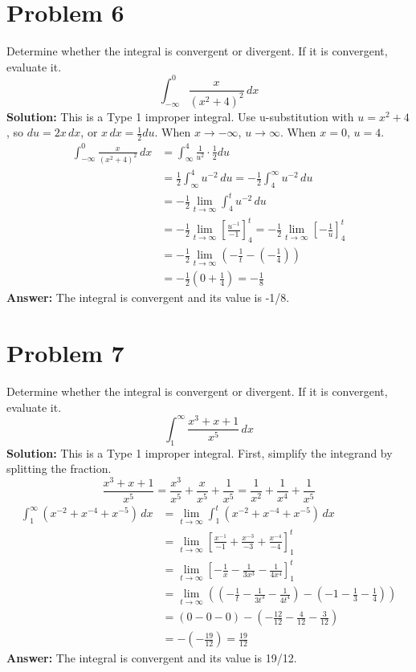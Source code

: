 \documentclass{article}
\begin{document}
\section{Problem 6}
Determine whether the integral is convergent or divergent. If it is convergent, evaluate it.
\[ \int_{-\infty}^{0} \frac{x}{(x^2+4)^2} \,dx \]
\textbf{Solution:}
This is a Type 1 improper integral. Use u-substitution with $u = x^2+4$, so $du = 2x\,dx$, or $x\,dx = \frac{1}{2}du$.
When $x \to -\infty$, $u \to \infty$. When $x=0$, $u=4$.
\begin{align*}
    \int_{-\infty}^{0} \frac{x}{(x^2+4)^2} \,dx &= \int_{\infty}^{4} \frac{1}{u^2} \cdot \frac{1}{2}du \\
    &= \frac{1}{2} \int_{\infty}^{4} u^{-2} \,du = -\frac{1}{2} \int_{4}^{\infty} u^{-2} \,du \\
    &= -\frac{1}{2} \lim_{t \to \infty} \int_{4}^{t} u^{-2} \,du \\
    &= -\frac{1}{2} \lim_{t \to \infty} \left[ \frac{u^{-1}}{-1} \right]_{4}^{t} = -\frac{1}{2} \lim_{t \to \infty} \left[ -\frac{1}{u} \right]_{4}^{t} \\
    &= -\frac{1}{2} \lim_{t \to \infty} \left( -\frac{1}{t} - \left(-\frac{1}{4}\right) \right) \\
    &= -\frac{1}{2} \left( 0 + \frac{1}{4} \right) = -\frac{1}{8}
\end{align*}
\textbf{Answer:} The integral is convergent and its value is -1/8.

\section{Problem 7}
Determine whether the integral is convergent or divergent. If it is convergent, evaluate it.
\[ \int_{1}^{\infty} \frac{x^3 + x + 1}{x^5} \,dx \]
\textbf{Solution:}
This is a Type 1 improper integral. First, simplify the integrand by splitting the fraction.
\[ \frac{x^3 + x + 1}{x^5} = \frac{x^3}{x^5} + \frac{x}{x^5} + \frac{1}{x^5} = \frac{1}{x^2} + \frac{1}{x^4} + \frac{1}{x^5} \]
\begin{align*}
    \int_{1}^{\infty} \left( x^{-2} + x^{-4} + x^{-5} \right) \,dx &= \lim_{t \to \infty} \int_{1}^{t} \left( x^{-2} + x^{-4} + x^{-5} \right) \,dx \\
    &= \lim_{t \to \infty} \left[ \frac{x^{-1}}{-1} + \frac{x^{-3}}{-3} + \frac{x^{-4}}{-4} \right]_{1}^{t} \\
    &= \lim_{t \to \infty} \left[ -\frac{1}{x} - \frac{1}{3x^3} - \frac{1}{4x^4} \right]_{1}^{t} \\
    &= \lim_{t \to \infty} \left( \left(-\frac{1}{t} - \frac{1}{3t^3} - \frac{1}{4t^4}\right) - \left(-1 - \frac{1}{3} - \frac{1}{4}\right) \right) \\
    &= (0 - 0 - 0) - \left(-\frac{12}{12} - \frac{4}{12} - \frac{3}{12}\right) \\
    &= - \left(-\frac{19}{12}\right) = \frac{19}{12}
\end{align*}
\textbf{Answer:} The integral is convergent and its value is 19/12.
\end{document}
